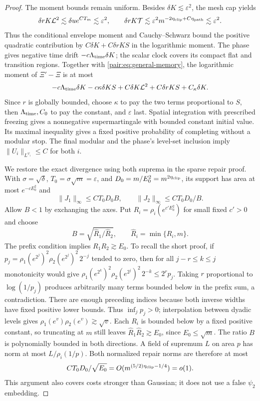 \documentclass[11pt]{article}
\numberwithin{equation}{section}
\begin{document}
\begin{proof}
The moment bounds remain uniform. Besides $\delta K\lesssim\varepsilon^2$,
the mesh cap yields
\[
 \delta rK\mathcal L^2\lesssim\delta u e^{CT_m}\lesssim\varepsilon^2,
 \qquad
 \delta rK\mathcal T\lesssim
 \varepsilon^2m^{-2\eta_{\rm clip}+C\eta_{\rm path}}
 \lesssim\varepsilon^2.
\]
Thus the conditional envelope moment and Cauchy--Schwarz bound the
positive quadratic contribution by $C\delta K+C\delta rKS$
in the logarithmic moment. The phase gives negative time drift
$-c\Lambda_{\rm time}\delta K$; the scalar clock covers its compact flat
and transition regions. Together with \eqref{pair:eq:general-memory},
the logarithmic moment of $\Xi'-\Xi$ is at most
\[
 -c\Lambda_{\rm time}\delta K-c\kappa\delta KS
 +C\delta K\mathcal L^2+C\delta rKS+C_\kappa\delta K.
\]
Since $r$ is globally bounded, choose $\kappa$ to pay the two
terms proportional to $S$, then $\Lambda_{\rm time},C_0$ to pay the constant,
and $\varepsilon$ last. Spatial integration with prescribed freezing
gives a nonnegative supermartingale with bounded constant initial
value. Its maximal inequality gives a fixed positive probability
of completing without a modular stop. The final modular and the
phase's level-set inclusion imply
$\|U_i\|_{L^{\psi_i}}\le C$ for both $i$.

We restore the exact divergence using both suprema in the sparse
repair proof. With $\sigma=\sqrt\delta$,
$T_0=\sigma\sqrt m=\varepsilon$, and $D_0=m/E_0^2=m^{2\eta_{\rm clip}}$,
its support has area at most $e^{-cE_0^2}$ and
\[
 \|J_1\|_\infty\le CT_0D_0B,\qquad
 \|J_2\|_\infty\le CT_0D_0/B.
\]
Allow $B<1$ by exchanging the axes. Put
$R_i=\rho_i(e^{c'E_0^2})$ for small fixed $c'>0$ and choose
\[
 B=\sqrt{\widehat R_1/\widehat R_2},\qquad
 \widehat R_i=\min\{R_i,m\}.
\]
The prefix condition implies $R_1R_2\gtrsim E_0$.
To recall the short proof, if
$p_j=\rho_1(e^{2^j})^2\rho_2(e^{2^j})^2\,2^{-j}$
tended to zero, then for all $j-r\le k\le j$ monotonicity would give
$\rho_1(e^{2^k})^2\rho_2(e^{2^j})^2\,2^{-k}\le2^rp_j$.
Taking $r$ proportional to $\log(1/p_j)$ produces arbitrarily many
terms bounded below in the prefix sum, a contradiction. There are
enough preceding indices because both inverse widths have fixed
positive lower bounds. Thus $\inf_jp_j>0$; interpolation between
dyadic levels gives $\rho_1(e^v)\rho_2(e^v)\gtrsim\sqrt v$.
Each $R_i$ is bounded below by a fixed positive constant, so truncating
at $m$ still leaves
$\widehat R_1\widehat R_2\gtrsim E_0$, since $E_0\le\sqrt m$.
The ratio $B$ is polynomially bounded in both directions.
A field of supremum $L$
on area $p$ has norm at most $L/\rho_i(1/p)$. Both normalized repair
norms are therefore at most
\[
 C T_0D_0/\sqrt{E_0}
 =O(m^{(5/2)\eta_{\rm clip}-1/4})=o(1).
\]
This argument also covers costs stronger than Gaussian; it does
not use a false $\psi_2$ embedding.


\end{proof}
\end{document}
